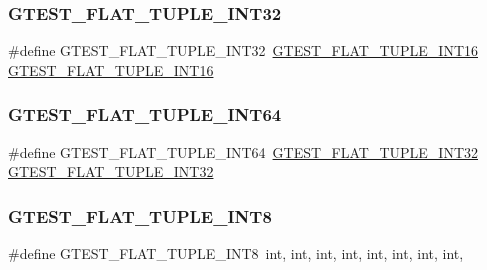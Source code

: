 \subsubsection{\texorpdfstring{GTEST\_FLAT\_TUPLE\_INT32}{GTEST\_FLAT\_TUPLE\_INT32}}
{\footnotesize\ttfamily \#define G\+T\+E\+S\+T\+\_\+\+F\+L\+A\+T\+\_\+\+T\+U\+P\+L\+E\+\_\+\+I\+N\+T32~\mbox{\hyperlink{_obj__test_2lib_2googletest-master_2googletest_2test_2gtest__unittest_8cc_aae118824bf510fcc9ecc8811db23d2f2}{G\+T\+E\+S\+T\+\_\+\+F\+L\+A\+T\+\_\+\+T\+U\+P\+L\+E\+\_\+\+I\+N\+T16}} \mbox{\hyperlink{_obj__test_2lib_2googletest-master_2googletest_2test_2gtest__unittest_8cc_aae118824bf510fcc9ecc8811db23d2f2}{G\+T\+E\+S\+T\+\_\+\+F\+L\+A\+T\+\_\+\+T\+U\+P\+L\+E\+\_\+\+I\+N\+T16}}}

\mbox{\label{_obj__test_2lib_2googletest-master_2googletest_2test_2gtest__unittest_8cc_a505487ba755aefa89ddfdc9127621c11}} 
\subsubsection{\texorpdfstring{GTEST\_FLAT\_TUPLE\_INT64}{GTEST\_FLAT\_TUPLE\_INT64}}
{\footnotesize\ttfamily \#define G\+T\+E\+S\+T\+\_\+\+F\+L\+A\+T\+\_\+\+T\+U\+P\+L\+E\+\_\+\+I\+N\+T64~\mbox{\hyperlink{_obj__test_2lib_2googletest-master_2googletest_2test_2gtest__unittest_8cc_a1c7baa94acbbb0d0ef250772fdad3972}{G\+T\+E\+S\+T\+\_\+\+F\+L\+A\+T\+\_\+\+T\+U\+P\+L\+E\+\_\+\+I\+N\+T32}} \mbox{\hyperlink{_obj__test_2lib_2googletest-master_2googletest_2test_2gtest__unittest_8cc_a1c7baa94acbbb0d0ef250772fdad3972}{G\+T\+E\+S\+T\+\_\+\+F\+L\+A\+T\+\_\+\+T\+U\+P\+L\+E\+\_\+\+I\+N\+T32}}}

\mbox{\label{_obj__test_2lib_2googletest-master_2googletest_2test_2gtest__unittest_8cc_af466a50c3676a701b0b9c5db2263f6e7}} 
\subsubsection{\texorpdfstring{GTEST\_FLAT\_TUPLE\_INT8}{GTEST\_FLAT\_TUPLE\_INT8}}
{\footnotesize\ttfamily \#define G\+T\+E\+S\+T\+\_\+\+F\+L\+A\+T\+\_\+\+T\+U\+P\+L\+E\+\_\+\+I\+N\+T8~int, int, int, int, int, int, int, int,}

